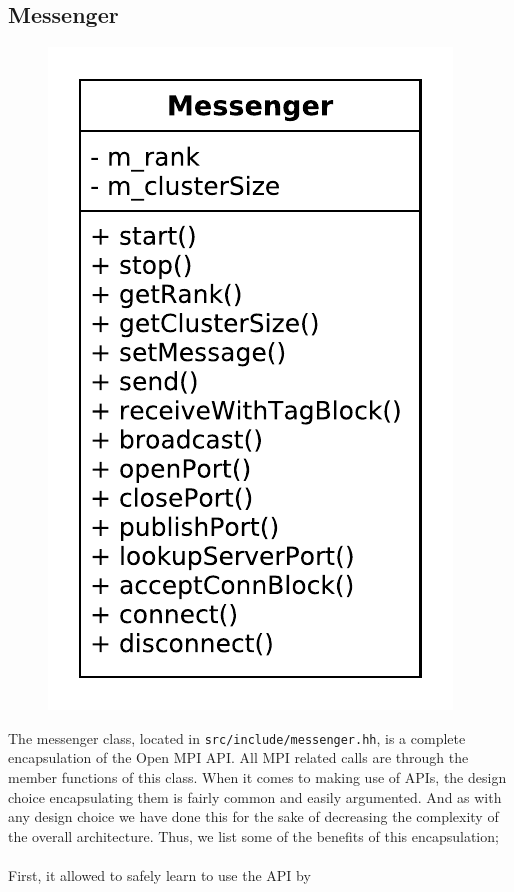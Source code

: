 \documentclass[11pt]{article}
\begin{document}
\subsection{Messenger}
\begin{figure}[H]
\includegraphics[scale=0.6]{image/messenger.pdf} \centering
\end{figure}
The messenger class, located in \texttt{src/include/messenger.hh}, is a complete
encapsulation of the Open MPI API. All MPI related calls are through the member
functions of this class. When it comes to making use of APIs, the design choice
encapsulating them is fairly common and easily argumented. And as with any
design choice we have done this for the sake of decreasing the complexity of the
overall architecture. Thus, we list some of the benefits of this
encapsulation;\paragraph{}First, it allowed to safely learn to use the API by
\end{document}
